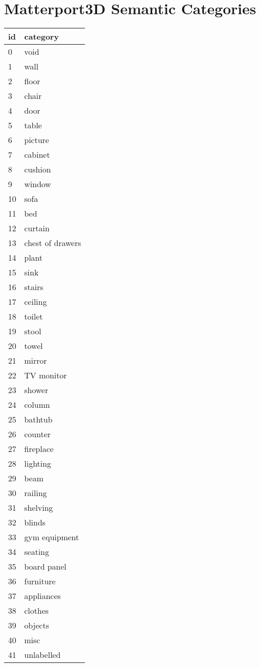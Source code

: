\section{Matterport3D Semantic Categories}
\label{app:categories}
\begin{table}[h!]
\centering
\begin{adjustbox}{totalheight=.65\textheight}
\begin{tabular}{|l|l|}
\hline
id & category \\
\hline
	0 & void \\
	1 & wall \\
	2 & floor \\
	3 & chair \\
	4 & door \\
	5 & table \\
	6 & picture \\
	7 & cabinet \\
	8 & cushion \\
	9 & window \\
	10 & sofa \\
	11 & bed \\
	12 & curtain \\
	13 & chest of drawers \\
	14 & plant \\
	15 & sink \\
	16 & stairs \\
	17 & ceiling \\
	18 & toilet \\
	19 & stool \\
	20 & towel \\
	21 & mirror \\
	22 & TV monitor \\
	23 & shower \\
	24 & column \\
	25 & bathtub \\
	26 & counter \\
	27 & fireplace \\
	28 & lighting \\
	29 & beam \\
	30 & railing \\
	31 & shelving \\
	32 & blinds \\
	33 & gym equipment \\
	34 & seating \\
	35 & board panel \\
	36 & furniture \\
	37 & appliances \\
	38 & clothes \\
	39 & objects \\
	40 & misc \\
	41 & unlabelled \\
	\hline
\end{tabular}
\end{adjustbox}
\end{table}
